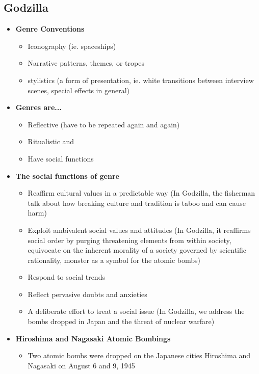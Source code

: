 \documentclass[11pt,fleqn]{book}
\begin{document}
\subsection{Godzilla}
\begin{itemize}
    \item \textbf{Genre Conventions}
    \begin{itemize}
        \item Iconography (ie. spaceships)
        \item Narrative patterns, themes, or tropes
        \item stylistics (a form of presentation, ie. white transitions between interview scenes, special effects in general)
    \end{itemize}
    \item \textbf{Genres are...}
    \begin{itemize}
        \item Reflective (have to be repeated again and again)
        \item Ritualistic and 
        \item Have social functions
    \end{itemize}
    \item \textbf{The social functions of genre}
    \begin{itemize}
        \item Reaffirm cultural values in a predictable way (In Godzilla, the fisherman talk about how breaking culture and tradition is taboo and can cause harm)
        \item Exploit ambivalent social values and attitudes (In Godzilla, it reaffirms social order by purging threatening elements from within society, equivocate on the inherent morality of a society governed by scientific rationality, monster as a symbol for the atomic bombs)
        \item Respond to social trends
        \item Reflect pervasive doubts and anxieties
        \item A deliberate effort to treat a social issue (In Godzilla, we address the bombs dropped in Japan and the threat of nuclear warfare)
    \end{itemize}
    \item \textbf{Hiroshima and Nagasaki Atomic Bombings}
    \begin{itemize}
        \item Two atomic bombs were dropped on the Japanese cities Hiroshima and Nagasaki
on August 6 and 9, 1945

\end{itemize}
\end{itemize}
\end{document}

